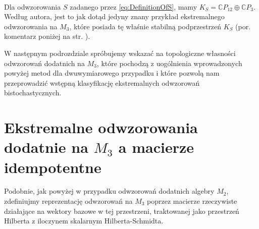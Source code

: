 {\paragraph{}

Dla odwzorowania $S$ zadanego przez \eqref{eq:DefinitionOfS}, mamy
$K_{S}= \mathbb{C} P_{12} \oplus \mathbb{C} P_{3}$.
Według autora, jest to jak dotąd jedyny znany przykład ekstremalnego
odwzorowania na $M_{3}$,
które posiada tę właśnie stabilną podprzestrzeń $K_S$
(por. komentarz poniżej na str. \pageref{com:onlyOneExample}).

W następnym podrozdziale spróbujemy wskazać na topologiczne własności
odwzorowań dodatnich na $M_3$, które pochodzą z uogólnienia wprowadzonych
powyżej metod dla dwuwymiarowego przypadku
i które pozwolą nam przeprowadzić wstępną klasyfikację ekstremalnych
odwzorowań bistochastycznych.

\section{Ekstremalne odwzorowania dodatnie na $M_{3}$
a macierze idempotentne}

Podobnie, jak powyżej w przypadku odwzorowań dodatnich algebry $M_{2}$,
zdefiniujmy reprezentację odwzorowań na $M_{3}$ poprzez macierze
rzeczywiste działające na wektory bazowe w tej przestrzeni,
traktowanej jako przestrzeń Hilberta z iloczynem skalarnym Hilberta-Schmidta.

}
